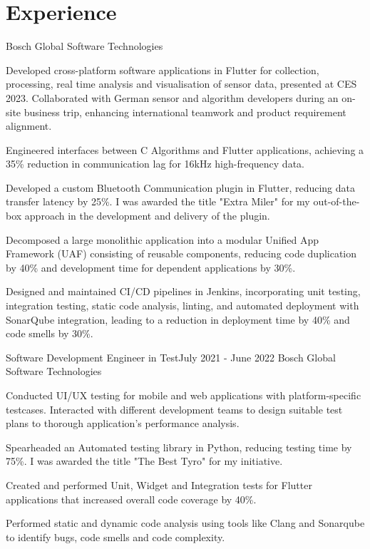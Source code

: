 \vspace{-5pt}
\section{Experience}
\resumeSubHeadingListStart
    {Bosch Global Software Technologies}{}
    \resumeItemListStart
          {
\item Developed cross-platform software applications in Flutter for collection, processing, real time analysis and visualisation of sensor data, presented at CES 2023. Collaborated with German sensor and algorithm developers during an on-site business trip, enhancing international teamwork and product requirement alignment.
  \item Engineered interfaces between C Algorithms and Flutter applications, achieving a 35\% reduction in communication lag for 16kHz high-frequency data.
  \item Developed a custom Bluetooth Communication plugin in Flutter, reducing data transfer latency by 25\%. I was awarded the title "Extra Miler" for my out-of-the-box approach in the development and delivery of the plugin.
  \item  Decomposed a large monolithic application into a modular Unified App Framework (UAF) consisting of reusable components, reducing code duplication by 40\% and development time for dependent applications by 30\%. 
   \item Designed and maintained CI/CD pipelines in Jenkins, incorporating unit testing, integration testing, static code analysis, linting, and automated deployment with SonarQube integration, leading to a reduction in deployment time by 40\% and code smells by 30\%.

}      \resumeItemListEnd
\vspace{-1pt}

    \resumeSubheading
		{Software Development Engineer in Test}{July 2021 - June 2022}
		{Bosch Global Software Technologies}{}
		\resumeItemListStart
        \item Conducted UI/UX testing for mobile and web applications with platform-specific testcases. Interacted with different development teams to design suitable test plans to thorough application's performance analysis.
        \item Spearheaded an Automated testing library in Python, reducing testing time by 75\%. I was awarded the title "The Best Tyro" for my initiative.
        \item Created and performed Unit, Widget and Integration tests for Flutter applications that increased overall code coverage by 40\%.
        \item Performed static and dynamic code analysis using tools like Clang and Sonarqube to identify bugs, code smells and code complexity.
	\resumeItemListEnd
    \vspace{-1pt}
    
